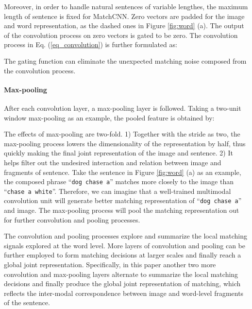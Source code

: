\documentclass[10pt,twocolumn,letterpaper]{article}
\begin{document}
Moreover, in order to handle natural sentences of variable lengthes, the maximum length of sentence is fixed for MatchCNN. Zero vectors are padded for the image and word representation, as the dashed ones in Figure \ref{fig:word} (a). The output of the convolution process on zero vectors is gated to be zero. The convolution process in Eq. (\ref{eq_convolution}) is further formulated as:
 
The gating function can eliminate the unexpected matching noise composed from the convolution process.

\vspace{-10pt}
\paragraph{Max-pooling} After each convolution layer, a max-pooling layer is followed. Taking a two-unit window max-pooling as an example, the pooled feature is obtained by:
 
The effects of max-pooling are two-fold. 1) Together with the stride as two, the max-pooling process lowers the  dimensionality of the representation by half, thus quickly making the final joint representation of the image and sentence. 2) It helps filter out the undesired interaction and relation between image and fragments of sentence. Take the sentence in Figure \ref{fig:word} (a) as an example, the composed phrase ``\texttt{\small dog chase a}'' matches more closely to the image than ``\texttt{\small chase a white}''. Therefore, we can imagine that a well-trained multimodal convolution unit will generate better matching representation of ``\texttt{\small dog chase a}'' and image. The max-pooling process will pool the matching representation out for further convolution and pooling processes.

The convolution and pooling processes explore and summarize the local matching signals explored at the word level. More layers of convolution and pooling can be further employed to form matching decisions at larger scales and finally reach a global joint representation. Specifically, in this paper another two more convolution and max-pooling layers alternate to summarize the local matching decisions and finally produce the global joint representation of matching, which reflects the inter-modal correspondence between image and word-level fragments of the sentence.
\end{document}
